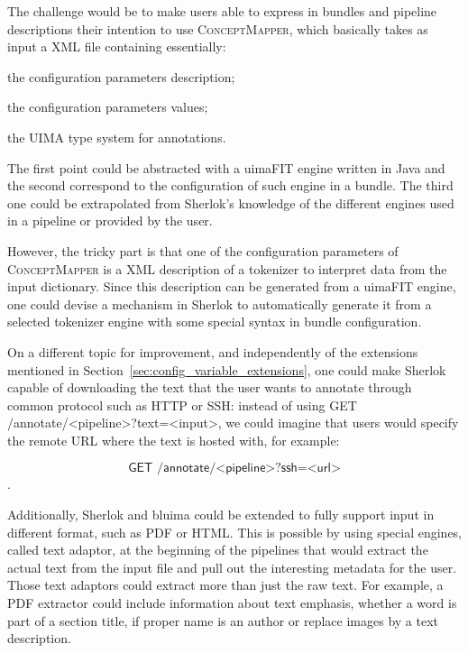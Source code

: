 \documentclass{article}
\newcommand{\ID}[1]{{\textsc{#1}}}
\newcommand{\REST}[1]{\textsf{#1}}
\begin{document}
The challenge would be to make users able to express in bundles and pipeline descriptions their
intention to use \ID{ConceptMapper}, which basically takes as input a XML file containing
essentially:
\begin{enumerate*}[label=\itshape\alph*\upshape)]

    \item the configuration parameters description;

    \item the configuration parameters values;

    \item the UIMA type system for annotations.

\end{enumerate*}
The first point could be abstracted with a uimaFIT engine written in Java and the second correspond
to the configuration of such engine in a bundle. The third one could be extrapolated from Sherlok's
knowledge of the different engines used in a pipeline or provided by the user.

However, the tricky part is that one of the configuration parameters of \ID{ConceptMapper} is a XML
description of a tokenizer to interpret data from the input dictionary. Since this description can
be generated from a uimaFIT engine, one could devise a mechanism in Sherlok to automatically
generate it from a selected tokenizer engine with some special syntax in bundle configuration.

On a different topic for improvement, and independently of the extensions mentioned in
Section~\ref{sec:config_variable_extensions}, one could make Sherlok capable of downloading the text
that the user wants to annotate through common protocol such as HTTP or SSH: instead of using
\REST{GET /annotate/<pipeline>?text=<input>}, we could imagine that users would specify the remote
URL where the text is hosted with, for example:

\[
    \REST{GET /annotate/<pipeline>?ssh=<url>}
\].

Additionally, Sherlok and bluima could be extended to fully support input in different format, such
as PDF or HTML. This is possible by using special engines, called text adaptor, at the beginning of
the pipelines that would extract the actual text from the input file and pull out the interesting
metadata for the user. Those text adaptors could extract more than just the raw text. For example, a
PDF extractor could include information about text emphasis, whether a word is part of a section
title, if proper name is an author or replace images by a text description.
\end{document}
